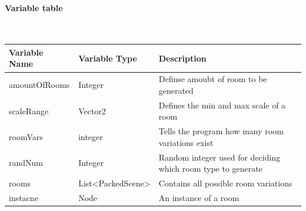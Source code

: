 \documentclass{article}
\newcommand{\myparagraph}[1]{\paragraph{#1}\mbox{}\\} %
\newcommand{\smallBr}{\vspace{1.5mm}}
\begin{document}
\myparagraph{Variable table} 
\smallBr
\begin{tabular}{l|l|l}
\multicolumn{1}{l|}{Variable Name} & Variable Type                            & \multicolumn{1}{|l}{Description}                             \\ \hline
amountOfRooms                       & Integer                                  & Definse amoubt of room to be generated                       \\
scaleRange                          & Vector2                                  & Defines the min and max scale of a room                      \\
roomVars                            & integer                                  & Tells the program how many room variations exist             \\
randNum                             & Integer                                  & Random integer used for deciding which room type to generate \\
rooms                               & List\textless{}PackedScene\textgreater{} & Contains all possible room variations                        \\
instacne                            & Node                                     & An instance of a room                                       
\end{tabular}
\end{document}
